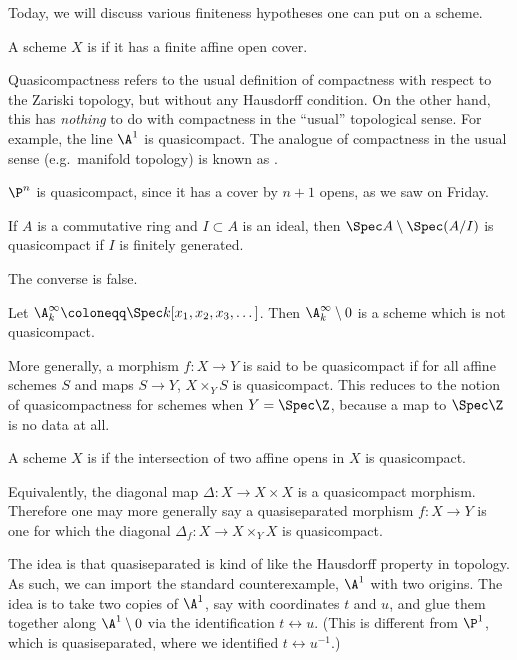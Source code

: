 Today, we will discuss various finiteness hypotheses one can put on a scheme.
\begin{defn}
A scheme $X$ is  if it has a finite affine open cover.
\end{defn}
Quasicompactness refers to the usual definition of compactness with respect to the Zariski topology, but without
any Hausdorff condition. On the other hand, this has \emph{nothing} to do with compactness in the ``usual''
topological sense. For example, the line $\A^1$ is quasicompact. The analogue of compactness in the usual sense
(e.g.\ manifold topology) is known as .
\begin{exm}
$\P^n$ is quasicompact, since it has a cover by $n+1$ opens, as we saw on Friday.
\end{exm}
\begin{prop}
If $A$ is a commutative ring and $I\subset A$ is an ideal, then $\Spec A\setminus \Spec(A/I)$ is quasicompact if
$I$ is finitely generated.
\end{prop}
The converse is false.
\begin{exm}
Let $\A_k^\infty\coloneqq\Spec k[x_1,x_2,x_3,\dotsc]$. Then $\A_k^\infty\setminus 0$ is a scheme which is not
quasicompact.
\end{exm}
\begin{rem}
More generally, a morphism $f\colon X\to Y$ is said to be quasicompact if for all affine schemes $S$ and maps $S\to
Y$, $X\times_Y S$ is quasicompact. This reduces to the notion of quasicompactness for schemes when $Y = \Spec\Z$,
because a map to $\Spec\Z$ is no data at all.
\end{rem}
\begin{defn}
A scheme $X$ is  if the intersection of two affine opens in $X$ is quasicompact.
\end{defn}
Equivalently, the diagonal map $\Delta\colon X\to X\times X$ is a quasicompact morphism. Therefore one may more
generally say a quasiseparated morphism $f\colon X\to Y$  is one for which the diagonal $\Delta_f\colon X\to
X\times_Y X$ is quasicompact.
\begin{exm}
The idea is that quasiseparated is kind of like the Hausdorff property in topology. As such, we can import the
standard counterexample, $\A^1$ with two origins. The idea is to take two copies of $\A^1$, say with coordinates
$t$ and $u$, and glue them together along $\A^1\setminus 0$ via the identification $t\leftrightarrow u$. (This is
different from $\P^1$, which is quasiseparated, where we identified $t\leftrightarrow u^{-1}$.)
\end{exm}
